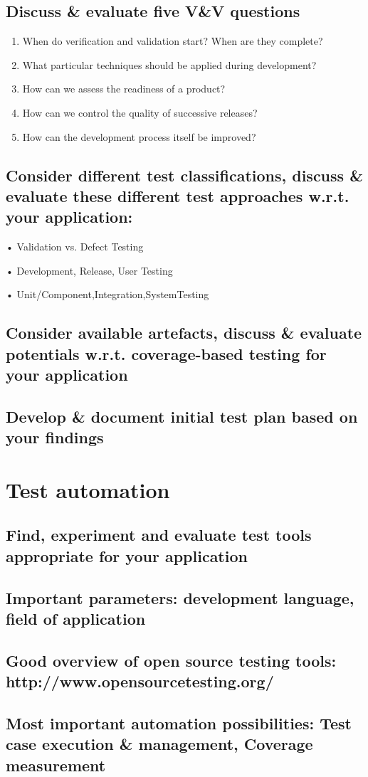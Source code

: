 \documentclass{scrartcl}
\begin{document}
\subsection{Discuss \& evaluate five V\&V questions}
\begin{enumerate}
  \item When do verification and validation start? When are they complete?
  \item What particular techniques should be applied during development?
  \item How can we assess the readiness of a product?
  \item How can we control the quality of successive releases?
  \item How can the development process itself be improved?
\end{enumerate}
\subsection{Consider different test classifications, discuss \& evaluate these different test approaches w.r.t. your application:}

• Validation vs. Defect Testing

• Development, Release, User Testing

• Unit/Component,Integration,SystemTesting

\subsection{Consider available artefacts, discuss \& evaluate potentials w.r.t. coverage-based testing for your application}

\subsection{Develop \& document initial test plan based on your findings}

\section{Test automation}

\subsection*{Find, experiment and evaluate test tools appropriate for your application}

\subsection*{Important parameters: development language, field of application}

\subsection*{Good overview of open source testing tools: http://www.opensourcetesting.org/}

\subsection*{Most important automation possibilities: Test case execution & management, Coverage measurement}
\end{document}
